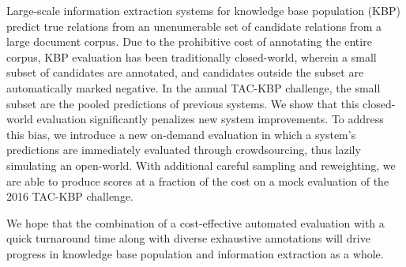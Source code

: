 
Large-scale information extraction systems for knowledge base population (KBP)
predict true relations from an unenumerable set of candidate relations from a large document corpus.
Due to the prohibitive cost of annotating the entire corpus,
KBP evaluation has been traditionally closed-world,
wherein a small subset of candidates are annotated, %
and candidates outside the subset are automatically marked negative.
In the annual TAC-KBP challenge, the small subset are the pooled predictions of previous systems.
We show that this closed-world evaluation significantly penalizes new system improvements.
To address this bias,
we introduce a new on-demand evaluation in which a system's predictions are immediately evaluated through crowdsourcing,
thus lazily simulating an open-world.
With additional careful sampling and reweighting,
we are able to produce scores at a fraction of the cost on a mock evaluation of the 2016 TAC-KBP challenge.

We hope that the combination of a cost-effective automated evaluation with a quick turnaround time along with diverse exhaustive annotations will drive progress in knowledge base population and information extraction as a whole.



